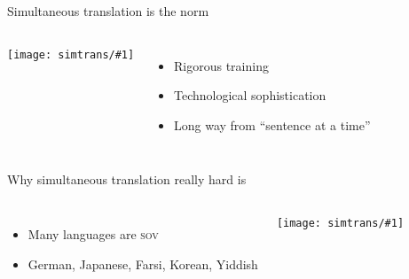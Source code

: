 \documentclass[compress]{beamer}
\newcommand{\gfxs}[2]{
\begin{center}
	\texttt{[image: simtrans/\#1]}
\end{center}
}
\begin{document}
\begin{frame}{Simultaneous translation is the norm}

  \begin{columns}
       \gfxs{nuremberg_translators}{.9}
       \begin{itemize}
         \item Rigorous training
         \item Technological sophistication
         \item Long way from ``sentence at a time''
       \end{itemize}
  \end{columns}

\end{frame}

\begin{frame}{Why simultaneous translation really hard is}

  \begin{columns}
      \begin{itemize}
        \item Many languages are \textsc{sov}
        \item \alert<2>{German}, Japanese, Farsi, Korean, \alert<3>{Yiddish}
      \end{itemize}
      \gfxs{yoda}{.6}
  \end{columns}

  \centering


\end{frame}
\end{document}
